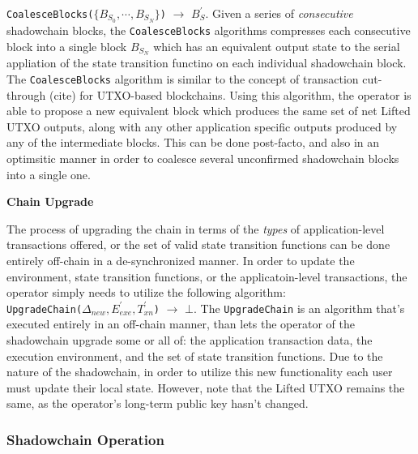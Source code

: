 \documentclass[10pt,a4paper]{article}
\theoremstyle{definition}
\begin{document}
\texttt{CoalesceBlocks($\{B_{S_0}, \cdots, B_{S_N}\}$)} $\rightarrow$
$B_{S}^\prime$. Given a series of \emph{consecutive} shadowchain blocks, the
\texttt{CoalesceBlocks} algorithms compresses each consecutive block into a
single block $B_{S_N}$ which has an equivalent output state to the serial
appliation of the state transition functino on each individual shadowchain
block. \\

The \texttt{CoalesceBlocks} algorithm is similar to the concept of transaction
cut-through (cite) for UTXO-based blockchains. Using this algorithm, the
operator is able to propose a new equivalent block which produces the same set
of net Lifted UTXO outputs, along with any other application specific outputs
produced by any of the intermediate blocks. This can be done post-facto, and
also in an optimsitic manner in order to coalesce several unconfirmed
shadowchain blocks into a single one.




\begin{center}
    \textbf{Chain Upgrade}
\end{center}

The process of upgrading the chain in terms of the \emph{types} of
application-level transactions offered, or the set of valid state transition
functions can be done entirely off-chain in a de-synchronized manner. In order to
update the environment, state transition functions, or the applicatoin-level
transactions, the operator simply needs to utilize the following algorithm: \\

\texttt{UpgradeChain($\Delta_{new}, E_{exe}^\prime, T_{xn}^\prime$)}
$\rightarrow$ $\bot$. The \texttt{UpgradeChain} is an algorithm that's executed
entirely in an off-chain manner, than lets the operator of the shadowchain
upgrade some or all of: the application transaction data, the execution
environment, and the set of state transition functions. Due to the nature of
the shadowchain, in order to utilize this new functionality each user must
update their local state. However, note that the Lifted UTXO remains the same,
as the operator's long-term public key hasn't changed.

\subsubsection{Shadowchain Operation}
\end{document}
